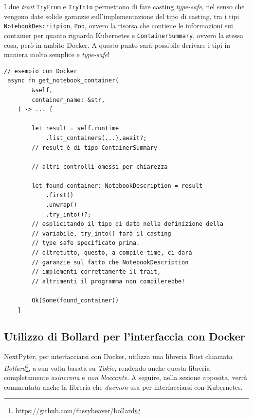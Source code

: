 I due \textit{trait} \verb|TryFrom| e \verb|TryInto| permettono di fare casting \textit{type-safe}, nel senso che vengono date solide garanzie sull'implementazione del tipo di casting, tra i tipi \verb|NotebookDescritpion|, \verb|Pod|, ovvero la risorsa che contiene le informazioni sui container per quanto riguarda Kubernetes e \verb|ContainerSummary|, ovvero la stessa cosa, però in ambito Docker.
\newline
A questo punto sarà possibile derivare i tipi in maniera molto semplice e \textit{type-safe}!
\begin{verbatim}
// esempio con Docker
 async fn get_notebook_container(
        &self, 
        container_name: &str,
    ) -> ... {
        
        let result = self.runtime
            .list_containers(...).await?;
        // result è di tipo ContainerSummary
        
        // altri controlli omessi per chiarezza
    
        let found_container: NotebookDescription = result
            .first()
            .unwrap()
            .try_into()?;
        // esplicitando il tipo di dato nella definizione della
        // variabile, try_into() farà il casting
        // type safe specificato prima.
        // oltretutto, questo, a compile-time, ci darà
        // garanzie sul fatto che NotebookDescription
        // implementi correttamente il trait,
        // altrimenti il programma non compilerebbe!
        
        Ok(Some(found_container))
    }

\end{verbatim}
\subsection{Utilizzo di Bollard per l'interfaccia con Docker}
NextPyter, per interfacciarsi con Docker, utilizza una libreria Rust chiamata \textit{Bollard}\footnote{https://github.com/fussybeaver/bollard}, a sua volta basata su \textit{Tokio}, rendendo anche questa libreria completamente \textit{asincrona} e \textit{non bloccante}.
\newline
A seguire, nella sezione apposita, verrà commentata anche la libreria che \textit{daemon} usa per interfacciarsi con Kubernetes. 
